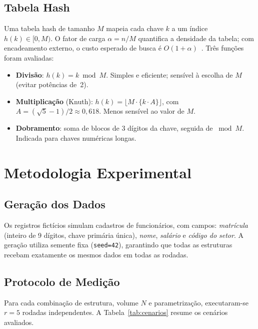 \documentclass[conference,a4paper]{IEEEtran}
\begin{document}
\subsection{Tabela Hash}

Uma tabela hash de tamanho $M$ mapeia cada chave $k$ a um índice
$h(k) \in [0, M)$. O fator de carga $\alpha = n/M$ quantifica a
densidade da tabela; com encadeamento externo, o custo esperado de
busca é $O(1 + \alpha)$~\cite{knuth1998}. Três funções foram avaliadas:

\begin{itemize}
  \item \textbf{Divisão}: $h(k) = k \bmod M$. Simples e eficiente;
        sensível à escolha de $M$ (evitar potências de~2).
  \item \textbf{Multiplicação} (Knuth): $h(k) = \lfloor M \cdot
        \{k \cdot A\} \rfloor$, com $A = (\sqrt{5}-1)/2 \approx 0{,}618$.
        Menos sensível ao valor de $M$.
  \item \textbf{Dobramento}: soma de blocos de 3 dígitos da chave,
        seguida de $\bmod M$. Indicada para chaves numéricas longas.
\end{itemize}

\section{Metodologia Experimental}
\label{sec:metodologia}

\subsection{Geração dos Dados}

Os registros fictícios simulam cadastros de funcionários, com campos:
\textit{matrícula} (inteiro de 9 dígitos, chave primária única),
\textit{nome}, \textit{salário} e \textit{código do setor}. A geração
utiliza semente fixa (\texttt{seed=42}), garantindo que todas as
estruturas recebam exatamente os mesmos dados em todas as rodadas.

\subsection{Protocolo de Medição}

Para cada combinação de estrutura, volume $N$ e parametrização,
executaram-se $r = 5$ rodadas independentes. A Tabela~\ref{tab:cenarios}
resume os cenários avaliados.
\end{document}

